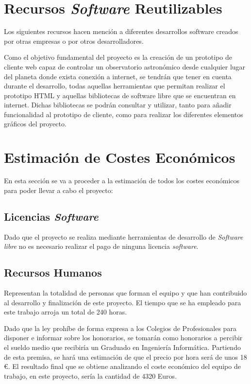 \section{Recursos \textit{Software} Reutilizables}
Los siguientes recursos hacen mención a diferentes desarrollos software creados por otras empresas o por otros desarrolladores.

Como el objetivo fundamental del proyecto es la creación de un prototipo de cliente web capaz de controlar un observatorio astronómico desde cualquier lugar del planeta donde exista conexión a internet, se tendrán que tener en cuenta durante el desarrollo, todas aquellas herramientas que permitan realizar el prototipo HTML y aquellas bibliotecas de software libre que se encuentran en internet. Dichas bibliotecas se podrán consultar y utilizar, tanto para añadir funcionalidad al prototipo de cliente, como para realizar los diferentes elementos gráficos del proyecto.

\section{Estimación de Costes Económicos}
En esta sección se va a proceder a la estimación de todos los costes económicos para poder llevar a cabo el proyecto:

\subsection{Licencias \textit{Software}}
Dado que el proyecto se realiza mediante herramientas de desarrollo de \textit{Software libre} no es necesario realizar el pago de ninguna licencia \textit{software}.

\subsection{Recursos Humanos}
Representan la totalidad de personas que forman el equipo y que han contribuido al desarrollo y finalización de este proyecto. El tiempo que se ha empleado para este trabajo arroja un total de 240 horas.

Dado que la ley prohíbe de forma expresa a los Colegios de Profesionales para disponer e informar sobre los honorarios, se tomarán como honorarios a percibir el sueldo medio que recibiría un Graduado en Ingeniería Informática. Partiendo de esta premisa, se hará una estimación de que el precio por hora será de unos 18 \euro. El resultado final que se obtiene analizando el coste económico del equipo de trabajo, en este proyecto, sería la cantidad de 4320 Euros.

